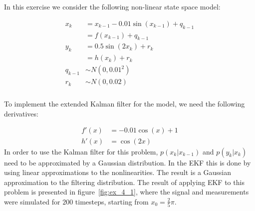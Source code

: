 \documentclass[a4paper,oneside,article]{memoir}
\begin{document}

\begin{table}[h]
	\centering
	
	\label{table:rmse3_3a}
\end{table}

\clearpage



\section{}
\subsection{}\label{sec:4_1}
In this exercise we consider the following non-linear state space model:

\begin{align}
	x_k&=x_{k-1}-0.01\sin(x_{k-1})+q_{k-1}\\
	&=f(x_{k-1})+q_{k-1}\\
	y_k&=0.5\sin(2x_k)+r_k\\
	&=h(x_{k})+r_{k}\\
	q_{k-1} &\sim N\left(0,0.01^2\right)\\
	r_{k} &\sim N\left(0,0.02 \right)
\end{align}


\subsubsection{}\label{sec:4_1a}
To implement the extended Kalman filter for the model, we need the
following derivatives:

\begin{align}
	f'(x)&=-0.01\cos(x)+1\\
	h'(x)&=\cos(2x)
\end{align}
In order to use the Kalman filter for this problem,
$p\left(x_{k}|x_{k-1}\right)$ and $p\left(y_{k}|x_{k}\right)$ need to
be approximated by a Gaussian distribution. In the EKF this is done
by using linear approximations to the nonlinearities. The result
is a Gaussian approximation to the filtering distribution. The result
of applying EKF to this problem is presented in figure~\ref{fig:ex_4_1},
where the signal and measurements were simulated for $200$ timesteps, starting
from $x_0=\frac{2}{5}\pi$.
\end{document}
